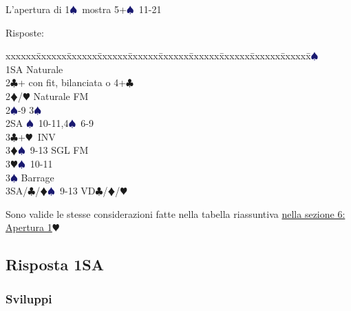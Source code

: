 \documentclass[a4paper,italian]{article}
\newcommand{\BC}{\textcolor{OliveGreen}{$\clubsuit$}}
\newcommand{\BD}{\textcolor{RedOrange}{$\vardiamondsuit$}}
\newcommand{\BH}{\textcolor{Red2}{$\varheartsuit${}}}
\newcommand{\BS}{\textcolor{MidnightBlue}{$\spadesuit${}}}
\newenvironment{bidtable}
{\begin{tabbing}

    xxxxxx\=xxxxxx\=xxxxxx\=xxxxxx\=xxxxxx\=xxxxxx\=xxxxxx\=xxxxxx\=xxxxxx\=xxxxxx\=\kill}
{\end{tabbing} }%
\begin{document}
\begin{multicols}{2}
    L'apertura di 1\BS\ mostra 5+\BS\ 11-21

    Risposte:
    \begin{bidtable}
        1\BS\+\\
        1SA \>\> Naturale\\
        2\BC \>+ con fit, bilanciata o 4+\BC \\
        2\BD/\BH \>\> Naturale FM\\
        2\BS \>-9 3\BS \\
        2SA \>\BS\ 10-11,4\BS\ 6-9\\
        3\BC \>+\BH\ INV\\
        3\BD \>\BS\ 9-13 SGL FM\\
        3\BH \>\BS\ 10-11\\
        3\BS \>\> Barrage\\
        3SA/\BC/\BD \>\BS\ 9-13 VD\BC /\BD /\BH \-
    \end{bidtable}

    Sono valide le stesse considerazioni fatte nella tabella riassuntiva \hyperref[1Maggiore]{nella sezione 6: Apertura 1\BH}

    \subsection{Risposta 1SA}

    \subsubsection{Sviluppi}


\end{multicols}
\end{document}
